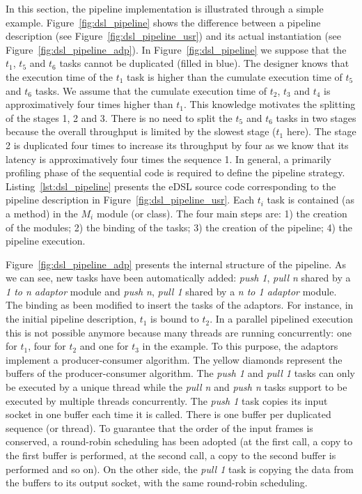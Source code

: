In this section, the pipeline implementation is illustrated through a simple
example. Figure~\ref{fig:dsl_pipeline} shows the difference between a pipeline
description (see Figure~\ref{fig:dsl_pipeline_usr}) and its actual instantiation
(see Figure~\ref{fig:dsl_pipeline_adp}). In Figure~\ref{fig:dsl_pipeline} we
suppose that the $t_1$, $t_5$ and $t_6$ tasks cannot be duplicated (filled in
blue). The designer knows that the execution time of the $t_1$ task is higher
than the cumulate execution time of $t_5$ and $t_6$ tasks. We assume that the
cumulate execution time of $t_2$, $t_3$ and $t_4$ is approximatively four times
higher than $t_1$. This knowledge motivates the splitting of the stages 1, 2 and
3. There is no need to split the $t_5$ and $t_6$ tasks in two stages because the
overall throughput is limited by the slowest stage ($t_1$ here). The stage 2 is
duplicated four times to increase its throughput by four as we know that its
latency is approximatively four times the sequence 1. In general, a primarily
profiling phase of the sequential code is required to define the pipeline
strategy. Listing~\ref{lst:dsl_pipeline} presents the \Cxx eDSL source code
corresponding to the pipeline description in Figure~\ref{fig:dsl_pipeline_usr}.
Each $t_i$ task is contained (as a method) in the $M_i$ module (or class). The
four main steps are: 1) the creation of the modules; 2) the binding of the
tasks; 3) the creation of the pipeline; 4) the pipeline execution.

Figure~\ref{fig:dsl_pipeline_adp} presents the internal structure of the
pipeline. As we can see, new tasks have been automatically added: \emph{push 1},
\emph{pull n} shared by a \emph{1 to n adaptor} module and \emph{push n},
\emph{pull 1} shared by a \emph{n to 1 adaptor} module. The binding as been
modified to insert the tasks of the adaptors. For instance, in the initial
pipeline description, $t_1$ is bound to $t_2$. In a parallel pipelined
execution this is not possible anymore because many threads are running
concurrently: one for $t_1$, four for $t_2$ and one for $t_3$ in the example. To
this purpose, the adaptors implement a producer-consumer algorithm. The yellow
diamonds represent the buffers of the producer-consumer algorithm. The
\emph{push 1} and \emph{pull 1} tasks can only be executed by a unique thread
while the \emph{pull n} and \emph{push n} tasks support to be executed by
multiple threads concurrently. The \emph{push 1} task copies its input socket in
one buffer each time it is called. There is one buffer per duplicated sequence
(or thread). To guarantee that the order of the input frames is conserved, a
round-robin scheduling has been adopted (at the first call, a copy to the first
buffer is performed, at the second call, a copy to the second buffer is
performed and so on). On the other side, the \emph{pull 1} task is copying the
data from the buffers to its output socket, with the same round-robin
scheduling.

